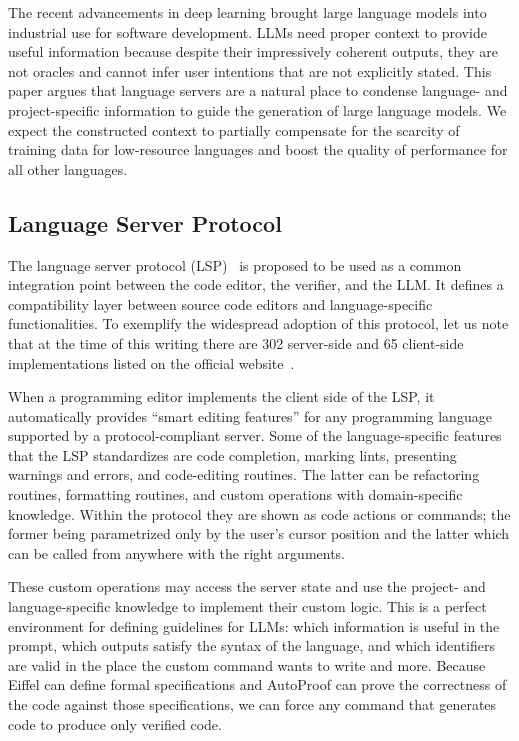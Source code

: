 \documentclass[runningheads]{llncs}
\begin{document}
The recent advancements in deep learning brought large language models into industrial use for software development.
LLMs need proper context to provide useful information because despite their impressively coherent outputs, they are not oracles and cannot infer user intentions that are not explicitly stated.
This paper argues that language servers are a natural place to condense language- and project-specific information to guide the generation of large language models.
We expect the constructed context to partially compensate for the scarcity of training data for low-resource languages and boost the quality of performance for all other languages.

\subsection{Language Server Protocol}\label{lsp}

The language server protocol (LSP)~\cite{lsp} is proposed to be used as a common integration point
between the code editor, the verifier, and the LLM.
It defines a compatibility layer between source code editors and language-specific functionalities.
To exemplify the widespread adoption of this protocol, let us note that at the time of this writing there are 302 server-side and 65 client-side implementations listed on the official website~\cite{lsp}.

When a programming editor implements the client side of the LSP, it automatically provides ``smart editing features'' for any programming language supported by a protocol-compliant server.
Some of the language-specific features that the LSP standardizes are code completion, marking lints, presenting warnings and errors, and code-editing routines.
The latter can be refactoring routines, formatting routines, and custom operations with domain-specific knowledge.
Within the protocol they are shown as code actions or commands; the former being parametrized only by the user's cursor position and the latter which can be called from anywhere with the right arguments.

These custom operations may access the server state and use the project- and language-specific knowledge to implement their custom logic.
This is a perfect environment for defining guidelines for LLMs: which information is useful in the prompt, which outputs satisfy the syntax of the language, and which identifiers are valid in the place the custom command wants to write and more.
Because Eiffel can define formal specifications and AutoProof can prove the correctness of the code against those specifications, we can force any command that generates code to produce only verified code.
\end{document}
